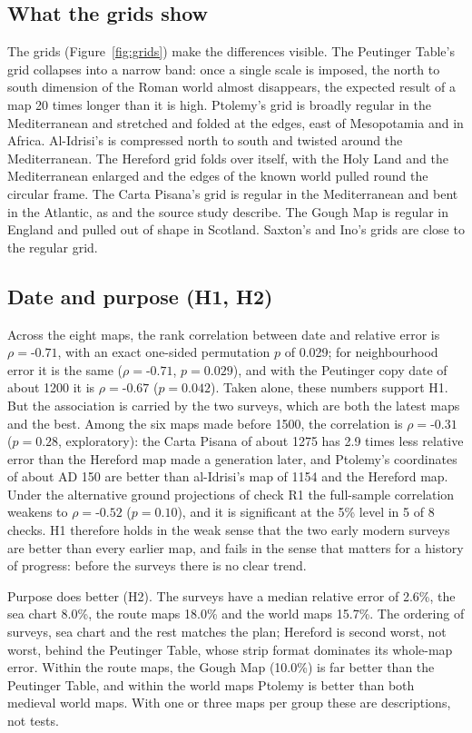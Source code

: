 \documentclass[11pt,a4paper]{article}
\begin{document}
\subsection{What the grids show}
The grids (Figure~\ref{fig:grids}) make the differences visible. The Peutinger Table's grid collapses into a narrow band: once a single scale is imposed, the north to south dimension of the Roman world almost disappears, the expected result of a map 20 times longer than it is high. Ptolemy's grid is broadly regular in the Mediterranean and stretched and folded at the edges, east of Mesopotamia and in Africa. Al-Idrisi's is compressed north to south and twisted around the Mediterranean. The Hereford grid folds over itself, with the Holy Land and the Mediterranean enlarged and the edges of the known world pulled round the circular frame. The Carta Pisana's grid is regular in the Mediterranean and bent in the Atlantic, as \citet{campbell1987} and the source study describe. The Gough Map is regular in England and pulled out of shape in Scotland. Saxton's and Ino's grids are close to the regular grid.

\subsection{Date and purpose (H1, H2)}
Across the eight maps, the rank correlation between date and relative error is $\rho = $-$0.71$, with an exact one-sided permutation $p$ of 0.029; for neighbourhood error it is the same ($\rho = $-$0.71$, $p = 0.029$), and with the Peutinger copy date of about 1200 it is $\rho = $-$0.67$ ($p = 0.042$). Taken alone, these numbers support H1. But the association is carried by the two surveys, which are both the latest maps and the best. Among the six maps made before 1500, the correlation is $\rho = $-$0.31$ ($p = 0.28$, exploratory): the Carta Pisana of about 1275 has 2.9 times less relative error than the Hereford map made a generation later, and Ptolemy's coordinates of about AD 150 are better than al-Idrisi's map of 1154 and the Hereford map. Under the alternative ground projections of check R1 the full-sample correlation weakens to $\rho = $-$0.52$ ($p = 0.10$), and it is significant at the 5\% level in 5 of 8 checks. H1 therefore holds in the weak sense that the two early modern surveys are better than every earlier map, and fails in the sense that matters for a history of progress: before the surveys there is no clear trend.

Purpose does better (H2). The surveys have a median relative error of 2.6\%, the sea chart 8.0\%, the route maps 18.0\% and the world maps 15.7\%. The ordering of surveys, sea chart and the rest matches the plan; Hereford is second worst, not worst, behind the Peutinger Table, whose strip format dominates its whole-map error. Within the route maps, the Gough Map (10.0\%) is far better than the Peutinger Table, and within the world maps Ptolemy is better than both medieval world maps. With one or three maps per group these are descriptions, not tests.
\end{document}
